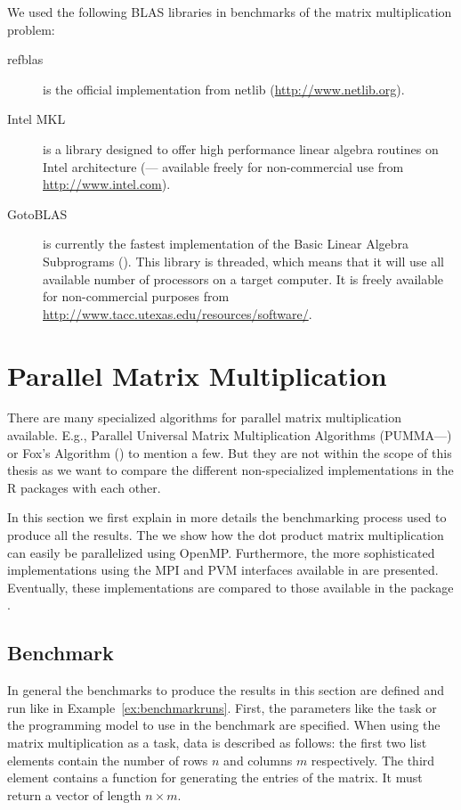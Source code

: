 We used the following BLAS libraries in benchmarks of  the matrix
multiplication problem:

\begin{description}
\item[refblas] is the official implementation from netlib
  (\url{http://www.netlib.org}).
\item[Intel MKL] is a library designed to offer high performance
  linear algebra routines on
 Intel architecture (\cite{intel07MKL}--- available
  freely for non-commercial use from \url{http://www.intel.com}). 
\item[GotoBLAS] is currently the fastest implementation of the Basic
  Linear Algebra Subprograms (\cite{goto07gotoblas}). This library is
  threaded, which means that it will use all available number of
  processors on a target computer. It is freely available for
  non-commercial purposes from
  \url{http://www.tacc.utexas.edu/resources/software/}.
\end{description}



\section{Parallel Matrix Multiplication}
\label{sec:parmm}

There are many specialized algorithms for parallel matrix multiplication
available. E.g., Parallel Universal Matrix Multiplication Algorithms
(PUMMA---\cite{choi93pumma}) or Fox's Algorithm (\cite{fox87mah}) to
mention a few. But they are not within the scope of this thesis
as we want to compare the different non-specialized implementations in the
R packages with each other.

In this section we first explain in more details the benchmarking process
used to produce all the results. The we show how the dot product
matrix multiplication can 
easily be parallelized using OpenMP. Furthermore, the more
sophisticated implementations using the MPI and PVM interfaces
available in  are
presented. Eventually, these implementations are compared to those
available in the package .   

\subsection{Benchmark}
\label{sec:benchmarkdescription}

In general the benchmarks to produce the results in this
section are defined and run like in
Example~\ref{ex:benchmarkruns}. First, the parameters like the task or
the programming model to use in the benchmark are specified. When using
the matrix multiplication as a task, data is described as follows: the
first two list elements contain the number of rows $n$ and columns $m$
respectively. The
third element contains a function for generating the entries of the
matrix. It must return a vector of length $n \times m$.

